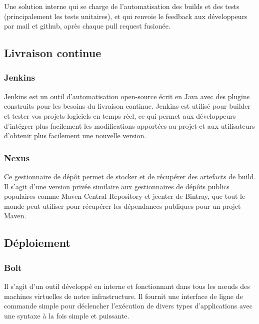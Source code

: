 Une solution interne qui se charge de l’automatisation des builds et des tests (principalement
les tests unitaires), et qui renvoie le feedback aux développeurs par mail et github, après chaque
pull request fusionée.


\subsection*{Livraison continue}
\subsubsection*{Jenkins}
Jenkins est un outil d’automatisation open-source écrit en Java avec des plugins construits pour
les besoins du livraison continue. Jenkins est utilisé pour builder et tester vos projets logiciels
en temps réel, ce qui permet aux développeurs d’intégrer plus facilement les modifications
apportées au projet et aux utilisateurs d’obtenir plus facilement une nouvelle version.


\subsubsection*{Nexus}
Ce gestionnaire de dépôt permet de stocker et de récupérer des artefacts de
build. Il s’agit d’une version privée similaire aux gestionnaires de dépôts publics
populaires comme Maven Central Repository et jcenter de Bintray, que tout le
monde peut utiliser pour récupérer les dépendances publiques pour un projet
Maven.

\subsection*{Déploiement}
\subsubsection*{Bolt}
Il s’agit d’un outil développé en interne et fonctionnant dans tous les nœuds des machines
virtuelles de notre infrastructure. Il fournit une interface de ligne de commande simple pour
déclencher l’exécution de divers types d’applications avec une syntaxe à la fois simple et puissante.

